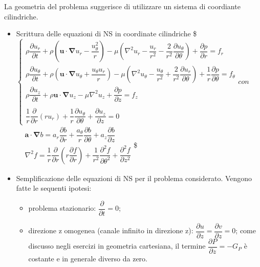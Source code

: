 \documentclass[letterpaper,10pt,italian]{jupyterBook}
\begin{document}
\sphinxAtStartPar
La geometria del problema suggerisce di utilizzare un sistema di
coordiante cilindriche.
\begin{itemize}
\item {} 
\sphinxAtStartPar
Scrittura delle equazioni di NS in coordinate cilindriche
\$\(\begin{cases}
    \rho \dfrac{\partial u_r}{\partial t}
    + \rho \left( \bm{u} \cdot \bm{\nabla}u_r - \dfrac{u_\theta^2}{r} \right)
    - \mu \left(\nabla^2 u_r 
       - \dfrac{u_r}{r^2} 
       - \dfrac{2}{r^2}\dfrac{\partial u_\theta}{\partial \theta} \right)  
       + \dfrac{\partial p}{\partial r} = f_r \\
    \rho \dfrac{\partial u_\theta}{\partial t}
    + \rho \left( \bm{u} \cdot \bm{\nabla} u_\theta + \dfrac{u_\theta u_r}{r} \right)
    - \mu \left(\nabla^2 u_\theta 
       - \dfrac{u_\theta}{r^2} 
       + \dfrac{2}{r^2}\dfrac{\partial u_r}{\partial \theta}  \right) 
    + \dfrac{1}{r} \dfrac{\partial p}{\partial \theta} = f_\theta\\
    \rho \dfrac{\partial u_z}{\partial t}
    + \rho \bm{u} \cdot \bm{\nabla} u_z
    - \mu \nabla^2 u_z
    + \dfrac{\partial p}{\partial z} = f_z \\ \\
    \dfrac{1}{r}\dfrac{\partial}{\partial r}\left( r u_r \right) 
    + \dfrac{1}{r}\dfrac{\partial u_\theta}{\partial \theta} 
    + \dfrac{\partial u_z}{\partial z} = 0
  \end{cases}\)\( con \)\(\begin{aligned}
  & \bm{a} \cdot \bm{\nabla} b = a_r \dfrac{\partial b}{\partial r} 
     + \dfrac{a_\theta}{r} \dfrac{\partial b}{\partial \theta}  
     + a_z \dfrac{\partial b}{\partial z} \\
  & \nabla^2 f = \dfrac{1}{r}\dfrac{\partial}{\partial r}
                      \left(r \dfrac{\partial f}{\partial r} \right) +
               \dfrac{1}{r^2} \dfrac{\partial^2 f}{\partial \theta^2} + 
               \dfrac{\partial^2 f}{\partial z^2} 
  \end{aligned}\)\$

\item {} 
\sphinxAtStartPar
Semplificazione delle equazioni di NS per il problema considerato.
Vengono fatte le sequenti ipotesi:
\begin{itemize}
\item {} 
\sphinxAtStartPar
problema stazionario: \(\dfrac{\partial}{\partial t} = 0\);

\item {} 
\sphinxAtStartPar
direzione z omogenea (canale infinito in direzione z):
\(\dfrac{\partial u}{\partial z} = \dfrac{\partial v}{\partial z} = 0\);
come discusso negli esercizi in geometria cartesiana, il termine
\(\dfrac{\partial P}{\partial z} = - G_P\) è costante e in
generale diverso da zero.


\end{itemize}
\end{itemize}
\end{document}
